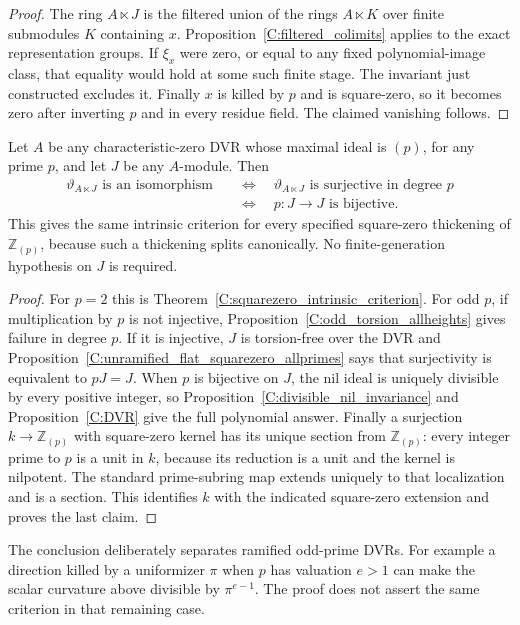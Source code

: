 \begin{proof}
The ring $A\ltimes J$ is the filtered union of the rings
$A\ltimes K$ over finite submodules $K$ containing $x$.
Proposition~\ref{C:filtered_colimits} applies to the exact
representation groups. If $\xi_x$ were zero, or equal to any
fixed polynomial-image class, that equality would hold at some
such finite stage. The invariant just constructed excludes it.
Finally $x$ is killed by $p$ and is square-zero, so it becomes
zero after inverting $p$ and in every residue field. The claimed
vanishing follows.
\end{proof}

\begin{theorem}
\label{C:allprime_squarezero_criterion}
Let $A$ be any characteristic-zero DVR whose maximal ideal is
$(p)$, for any prime $p$, and let $J$ be any $A$-module. Then
\[
 \begin{aligned}
 \vartheta_{A\ltimes J}\text{ is an isomorphism}
 &\quad\Longleftrightarrow\quad
 \vartheta_{A\ltimes J}\text{ is surjective in degree }p\\
 &\quad\Longleftrightarrow\quad
 p:J\longrightarrow J\text{ is bijective}.
 \end{aligned}
\]
This gives the same intrinsic criterion for every specified
square-zero thickening of $\mathbb Z_{(p)}$, because such a
thickening splits canonically. No finite-generation hypothesis
on $J$ is required.
\end{theorem}
\begin{proof}
For $p=2$ this is Theorem~\ref{C:squarezero_intrinsic_criterion}.
For odd $p$, if multiplication by $p$ is not injective,
Proposition~\ref{C:odd_torsion_allheights} gives failure in degree
$p$. If it is injective, $J$ is torsion-free over the DVR and
Proposition~\ref{C:unramified_flat_squarezero_allprimes} says that
surjectivity is equivalent to $pJ=J$.
When $p$ is bijective on $J$, the nil ideal is uniquely divisible
by every positive integer, so
Proposition~\ref{C:divisible_nil_invariance} and
Proposition~\ref{C:DVR} give the full polynomial answer.
Finally a surjection $k\to\mathbb Z_{(p)}$ with square-zero kernel
has its unique section from $\mathbb Z_{(p)}$: every integer prime
to $p$ is a unit in $k$, because its reduction is a unit and the
kernel is nilpotent. The standard prime-subring map extends
uniquely to that localization and is a section. This identifies
$k$ with the indicated square-zero extension and proves the last
claim.
\end{proof}

The conclusion deliberately separates ramified odd-prime DVRs.
For example a direction killed by a uniformizer $\pi$ when
$p$ has valuation $e>1$ can make the scalar curvature above
divisible by $\pi^{e-1}$. The proof does not assert the same
criterion in that remaining case.
